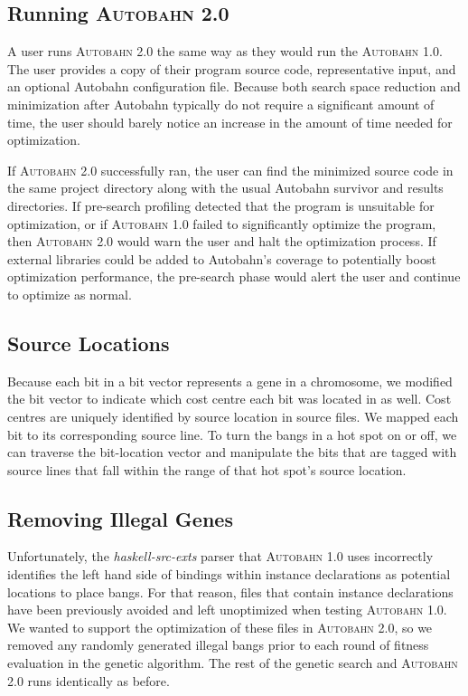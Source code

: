 \documentclass[format=sigplan, review=true]{acmart}
\newcommand{\hotspot}[0]{hot spot}
\newcommand{\Ao}[0]{\textsc{Autobahn 1.0}}
\newcommand{\At}[0]{\textsc{Autobahn 2.0}}
\newcommand{\preopt}[0]{pre-search}
\begin{document}
\subsection{Running \At{}}

A user runs \At{} the same way as they would run the \Ao{}. The user provides a copy of their program source code, representative input, and an optional Autobahn configuration file. Because both search space reduction and minimization after Autobahn typically do not require a significant amount of time, the user should barely notice an increase in the amount of time needed for optimization. 

If \At{} successfully ran, the user can find the minimized source code in the same project directory along with the usual Autobahn survivor and results directories. If \preopt{} profiling detected that the program is unsuitable for optimization, or if \Ao{} failed to significantly optimize the program, then \At{} would warn the user and halt the optimization process. If external libraries could be added to Autobahn's coverage to potentially boost optimization performance, the \preopt{} phase would alert the user and continue to optimize as normal.

\subsection{Source Locations}

Because each bit in a bit vector represents a gene in a chromosome, we modified the bit vector to indicate which cost centre each bit was located in as well. 
Cost centres are uniquely identified by source location in source files. We mapped each bit to its corresponding source line. To turn the bangs in a \hotspot{} on or off, we can traverse the bit-location vector and manipulate the bits that are tagged with source lines that fall within the range of that \hotspot{}'s source location.

\subsection{Removing Illegal Genes}

Unfortunately, the \textit{haskell-src-exts} parser that \Ao{} uses incorrectly identifies the left hand side of bindings within instance declarations as potential locations to place bangs. For that reason, files that contain instance declarations have been previously avoided and left unoptimized when testing \Ao{}. We wanted to support the optimization of these files in \At{}, so we removed any randomly generated illegal bangs prior to each round of fitness evaluation in the genetic algorithm. The rest of the genetic search and \At{} runs identically as before.
\end{document}
